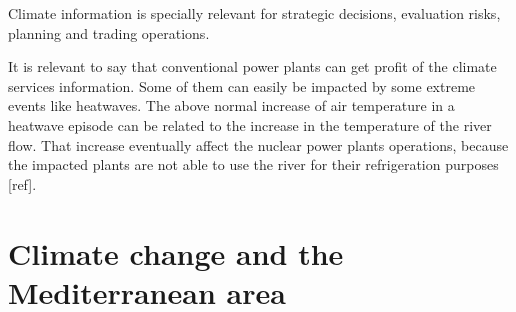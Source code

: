 Climate information is specially relevant for strategic decisions, evaluation risks, planning and trading operations.


It is relevant to say that conventional power plants can get profit of the climate services information. Some of them can easily be impacted by some extreme events like heatwaves. The above normal increase of air temperature in a heatwave episode can be related to the increase in the temperature of the river flow. That increase eventually affect the nuclear power plants operations, because the impacted plants are not able to use the river for their refrigeration purposes [ref].   

\section{Climate change and the Mediterranean area}


